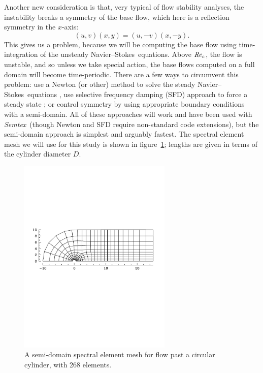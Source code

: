 \documentclass[11pt,a4paper]{report}
\newcommand\Rey{\mbox{\textit{Re}}}
\newcommand\NavSto{Navier--Stokes}
\newcommand{\Semtex}{\emph{Semtex}}
\begin{document}
Another new consideration is that, very typical of flow stability
analyses, the instability breaks a symmetry of the base flow, which
here is a reflection symmetry in the $x$-axis:
\begin{equation}
(u,v)(x,y)=(u,-v)(x,-y).
\end{equation}
This gives us a problem, because we will be computing the base flow
using time-integration of the unsteady \NavSto\ equations.  Above
$\Rey_c$, the flow is unstable, and so unless we take special action,
the base flows computed on a full domain will become time-periodic.
There are a few ways to circumvent this problem: use a Newton (or
other) method to solve the steady \NavSto\ equations
\citep{tuba00,hmb02a}, use selective frequency damping (SFD) approach
to force a steady state \citep{abhhms06}; or control symmetry by using
appropriate boundary conditions with a semi-domain.  All of these
approaches will work and have been used with \Semtex\ (though Newton
and SFD require non-standard code extensions), but the semi-domain
approach is simplest and arguably fastest.  The spectral element
mesh we will use for this study is shown in
figure~\ref{fig.semicylmesh}; lengths are given in terms of the
cylinder diameter $D$.

\begin{figure}
\begin{center}
\includegraphics[width=0.65\textwidth]{semicyl02mesh.pdf}
\end{center}
\caption{A semi-domain spectral element mesh for flow past a circular
  cylinder, with 268 elements.}
\label{fig.semicylmesh}
\end{figure}
\end{document}
